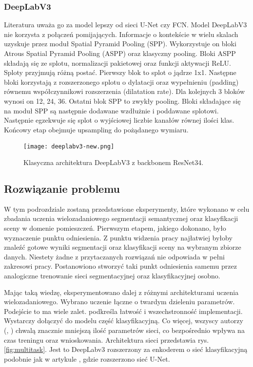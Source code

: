 \subsubsection{DeepLabV3}
Literatura uważa go za model lepszy od sieci U-Net czy FCN. Model DeepLabV3 nie korzysta z połączeń pomijających. Informacje o kontekście w wielu skalach uzyskuje przez moduł Spatial Pyramid Pooling (SPP). Wykorzystuje on bloki Atrous Spatial Pyramid Pooling (ASPP) oraz klasyczny pooling. Bloki ASPP składają się ze splotu, normalizacji pakietowej oraz funkcji aktywacji ReLU. Sploty przyjmują różną postać. Pierwszy blok to splot o jądrze 1x1. Następne bloki korzystają z rozszerzonego splotu o dylatacji oraz wypełnieniu (padding) równemu współczynnikowi rozszerzenia (dilatation rate). Dla kolejnych 3 bloków wynosi on 12, 24, 36. Ostatni blok SPP to zwykły pooling. Bloki składające się na moduł SPP są następnie dodawane wzdłużnie i poddawane splotowi. Następnie egzekwuje się splot o wyjściowej liczbie kanałów równej ilości klas. Końcowy etap obejmuje upsampling do pożądanego wymiaru.
\begin{figure}[ht!]
\texttt{[image: deeplabv3-new.png]}
\caption{Klasyczna architektura DeepLabV3 z backbonem ResNet34.}
\label{fig:deeplabv3}
\end{figure}
\subsection{Rozwiązanie problemu}
W tym podrozdziale zostaną przedstawione eksperymenty, które wykonano w celu zbadania uczenia wielozadaniowego segmentacji semantycznej oraz klasyfikacji sceny w domenie pomieszczeń. Pierwszym etapem, jakiego dokonano, było wyznaczenie punktu odniesienia. Z punktu widzenia pracy najłatwiej byłoby znaleźć gotowe wyniki segmentacji oraz klasyfikacji sceny na wybranym zbiorze danych. Niestety żadne z przytaczanych rozwiązań nie odpowiada w pełni zakresowi pracy. Postanowiono stworzyć taki punkt odniesienia samemu przez analogiczne trenowanie sieci segmentacyjnej oraz klasyfikacyjnej osobno.

Mając taką wiedzę, eksperymentowano dalej z różnymi architekturami uczenia wielozadaniowego. Wybrano uczenie łączne o twardym dzieleniu parametrów. Podejście to ma wiele zalet. \cite{mehta2018net} podkreśla łatwość i wszechstronność implementacji. Wystarczy dołączyć do modelu część klasyfikacyjną. Co więcej, wszyscy autorzy (\cite{mehta2018net}, \cite{9892852}) chwalą znacznie mniejszą ilość parametrów sieci, co bezpośrednio wpływa na czas treningu oraz wnioskowania. Architektura sieci przedstawia rys. \ref{fig:multitask}. Jest to DeepLabv3 rozszerzony za enkoderem o sieć klasyfikacyjną podobnie jak w artykule \cite{mehta2018net}, gdzie rozszerzono sieć U-Net.

